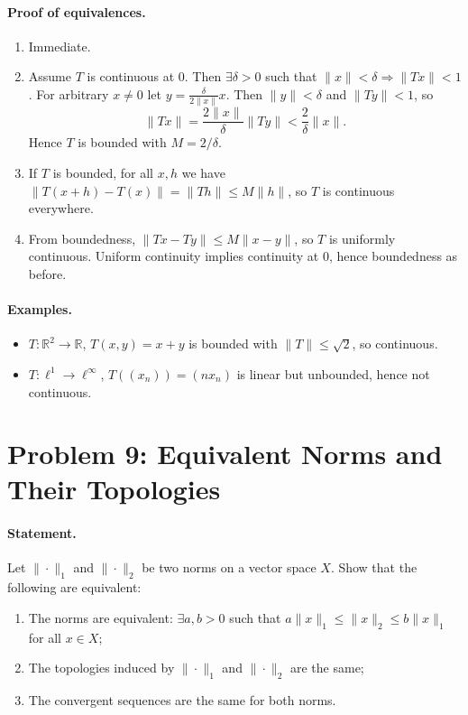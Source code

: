 \documentclass[12pt,a4paper]{article}
\theoremstyle{plain}
\theoremstyle{definition}
\theoremstyle{remark}
\theoremstyle{remark}
\begin{document}
\paragraph{Proof of equivalences.}
\begin{enumerate}
	\item[(1)$\Rightarrow$(2)] Immediate.
	
	\item[(2)$\Rightarrow$(3)] Assume $T$ is continuous at $0$.
	Then $\exists\delta>0$ such that $\|x\|<\delta\Rightarrow\|Tx\|<1$.
	For arbitrary $x\ne0$ let $y=\frac{\delta}{2\|x\|}x$.
	Then $\|y\|<\delta$ and $\|Ty\|<1$, so
	\[
	\|Tx\|=\frac{2\|x\|}{\delta}\|Ty\|<\frac{2}{\delta}\|x\|.
	\]
	Hence $T$ is bounded with $M=2/\delta$.
	
	\item[(3)$\Rightarrow$(1)] If $T$ is bounded, for all $x,h$ we have
	$\|T(x+h)-T(x)\|=\|Th\|\le M\|h\|$, so $T$ is continuous everywhere.
	
	\item[(3)$\Leftrightarrow$(4)] From boundedness, $\|Tx-Ty\|\le M\|x-y\|$, so $T$ is uniformly continuous.
	Uniform continuity implies continuity at $0$, hence boundedness as before.
\end{enumerate}

\paragraph{Examples.}
\begin{itemize}
	\item $T:\mathbb{R}^2\to\mathbb{R}$, $T(x,y)=x+y$ is bounded with $\|T\|\le\sqrt2$, so continuous.
	\item $T:\ell^1\to\ell^\infty$, $T((x_n))=(n x_n)$ is linear but unbounded, hence not continuous.
\end{itemize}


\section*{Problem 9: Equivalent Norms and Their Topologies}

\paragraph{Statement.}
Let $\|\cdot\|_1$ and $\|\cdot\|_2$ be two norms on a vector space $X$.
Show that the following are equivalent:
\begin{enumerate}
	\item The norms are equivalent: $\exists a,b>0$ such that $a\|x\|_1\le\|x\|_2\le b\|x\|_1$ for all $x\in X$;
	\item The topologies induced by $\|\cdot\|_1$ and $\|\cdot\|_2$ are the same;
	\item The convergent sequences are the same for both norms.
\end{enumerate}
\end{document}

